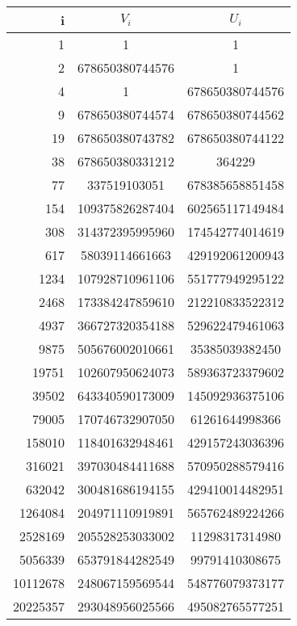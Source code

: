 \begin{enumerate}
		\begin{center}
			\begin{tabular}{ | r | c | c |}
				\hline
				i               & $V_i$           & $U_i$ \\
				\hline
				1               & 1               & 1 \\
				2               & 678650380744576 & 1 \\
				4               & 1               & 678650380744576 \\
				9               & 678650380744574 & 678650380744562 \\
				19              & 678650380743782 & 678650380744122 \\
				38              & 678650380331212 & 364229 \\
				77              & 337519103051    & 678385658851458 \\
				154             & 109375826287404 & 602565117149484 \\
				308             & 314372395995960 & 174542774014619 \\
				617             & 58039114661663  & 429192061200943 \\
				1234            & 107928710961106 & 551777949295122 \\
				2468            & 173384247859610 & 212210833522312 \\
				4937            & 366727320354188 & 529622479461063 \\
				9875            & 505676002010661 & 35385039382450 \\
				19751           & 102607950624073 & 589363723379602 \\
				39502           & 643340590173009 & 145092936375106 \\
				79005           & 170746732907050 & 61261644998366 \\
				158010          & 118401632948461 & 429157243036396 \\
				316021          & 397030484411688 & 570950288579416 \\
				632042          & 300481686194155 & 429410014482951 \\
				1264084         & 204971110919891 & 565762489224266 \\
				2528169         & 205528253033002 & 11298317314980 \\
				5056339         & 653791844282549 & 99791410308675 \\
				10112678        & 248067159569544 & 548776079373177 \\
				20225357        & 293048956025566 & 495082765577251 \\

\end{tabular}
\end{center}
\end{enumerate}
